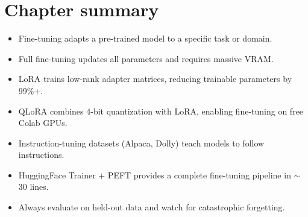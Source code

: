 \section{Chapter summary}

\begin{itemize}
  \item Fine-tuning adapts a pre-trained model to a specific task or domain.
  \item Full fine-tuning updates all parameters and requires massive VRAM.
  \item LoRA trains low-rank adapter matrices, reducing trainable parameters by 99\%+.
  \item QLoRA combines 4-bit quantization with LoRA, enabling fine-tuning on free Colab GPUs.
  \item Instruction-tuning datasets (Alpaca, Dolly) teach models to follow instructions.
  \item HuggingFace Trainer + PEFT provides a complete fine-tuning pipeline in $\sim$30 lines.
  \item Always evaluate on held-out data and watch for catastrophic forgetting.
\end{itemize}
